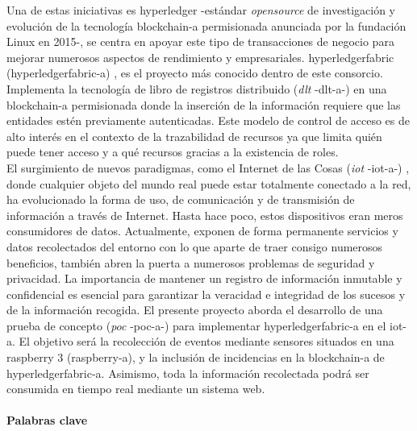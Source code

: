 \documentclass[12pt,a4paper, twoside]{report}
\begin{document}
	Una de estas iniciativas es \gls{hyperledger} \cite{hyperledger:url} -estándar \textit{\gls{opensource}} de investigación y evolución de la tecnología \gls{blockchain-a} permisionada anunciada por la fundación Linux en 2015-, se centra en apoyar este tipo de transacciones de negocio para mejorar numerosos aspectos de rendimiento y empresariales. \gls{hyperledgerfabric} (\gls{hyperledgerfabric-a}) \cite{hyperledgerfabric:url}, es el proyecto más conocido dentro de este consorcio. Implementa la tecnología de libro de registros distribuido (\textit{\gls{dlt}} -\gls{dlt-a}-) \cite{wattenhofer:DLT} en una \gls{blockchain-a} permisionada donde la inserción de la información requiere que las entidades estén previamente autenticadas. Este modelo de control de acceso es de alto interés en el contexto de la trazabilidad de recursos ya que limita quién puede tener acceso y a qué recursos gracias a la existencia de roles. \\
		
	El surgimiento de nuevos paradigmas, como el Internet de las Cosas (\textit{\gls{iot}} -\gls{iot-a}-) \cite{christidis:2016:bsciot}, \cite{dorri:2017:TOBI} donde cualquier objeto del mundo real puede estar totalmente conectado a la red, ha evolucionado la forma de uso, de comunicación y de transmisión de información a través de Internet. Hasta hace poco, estos dispositivos eran meros consumidores de datos. Actualmente, exponen de forma permanente servicios y datos recolectados del entorno con lo que aparte de traer consigo numerosos beneficios, también abren la puerta a numerosos problemas de seguridad y privacidad. La importancia de mantener un registro de información inmutable y confidencial es esencial para garantizar la veracidad e integridad de los sucesos y de la información recogida. El presente proyecto aborda el desarrollo de una prueba de concepto (\textit{\gls{poc}} -\gls{poc-a}-) para implementar \gls{hyperledgerfabric-a} en el \gls{iot-a}. El objetivo será la recolección de eventos mediante sensores situados en una \gls{raspberry} 3 (\gls{raspberry-a}), y la inclusión de incidencias en la \gls{blockchain-a} de \gls{hyperledgerfabric-a}. Asimismo, toda la información recolectada podrá ser consumida en tiempo real mediante un sistema web.
			
	\paragraph{Palabras clave \\}
		
\end{document}
